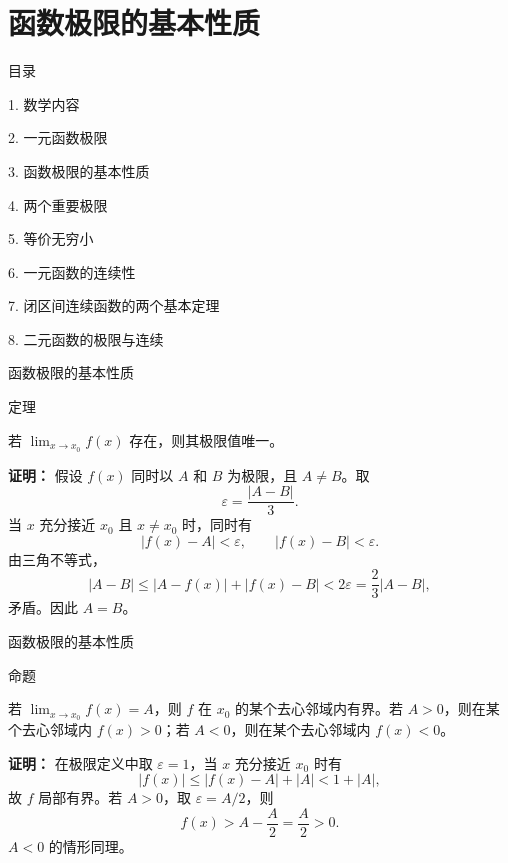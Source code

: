 \documentclass[aspectratio=169,10pt,fontset=fandol]{ctexbeamer}
\begin{document}
\section{函数极限的基本性质}
\begin{frame}[t,fragile]{目录}
\normalsize
{\color{black}\normalsize 1. 数学内容\par}\vspace{0.3em}
{\color{black}\normalsize 2. 一元函数极限\par}\vspace{0.3em}
{\color{blue}\normalsize 3. 函数极限的基本性质\par}\vspace{0.3em}
{\color{gray!40}\normalsize 4. 两个重要极限\par}\vspace{0.3em}
{\color{gray!40}\normalsize 5. 等价无穷小\par}\vspace{0.3em}
{\color{gray!40}\normalsize 6. 一元函数的连续性\par}\vspace{0.3em}
{\color{gray!40}\normalsize 7. 闭区间连续函数的两个基本定理\par}\vspace{0.3em}
{\color{gray!40}\normalsize 8. 二元函数的极限与连续\par}\vspace{0.3em}
\end{frame}
\begin{frame}[t,fragile]{函数极限的基本性质}
\normalsize
\begin{block}{定理}
{\normalsize

若 \(\lim_{x\to x_0}f(x)\) 存在，则其极限值唯一。

}
\end{block}
\pause
{\normalsize
\textbf{证明：}
假设 \(f(x)\) 同时以 \(A\) 和 \(B\) 为极限，且 \(A\neq B\)。取
\[
\varepsilon=\frac{|A-B|}{3}.
\]
当 \(x\) 充分接近 \(x_0\) 且 \(x\neq x_0\) 时，同时有
\[
|f(x)-A|<\varepsilon,\qquad |f(x)-B|<\varepsilon.
\]
由三角不等式，
\[
|A-B|\leq |A-f(x)|+|f(x)-B|<2\varepsilon=\frac23|A-B|,
\]
矛盾。因此 \(A=B\)。

}
\end{frame}
\begin{frame}[t,fragile]{函数极限的基本性质}
\normalsize
\begin{block}{命题}
{\normalsize

若 \(\lim_{x\to x_0}f(x)=A\)，则 \(f\) 在 \(x_0\) 的某个去心邻域内有界。若 \(A>0\)，则在某个去心邻域内 \(f(x)>0\)；若 \(A<0\)，则在某个去心邻域内 \(f(x)<0\)。

}
\end{block}
\pause
{\normalsize
\textbf{证明：}
在极限定义中取 \(\varepsilon=1\)，当 \(x\) 充分接近 \(x_0\) 时有
\[
|f(x)|\leq |f(x)-A|+|A|<1+|A|,
\]
故 \(f\) 局部有界。若 \(A>0\)，取 \(\varepsilon=A/2\)，则
\[
f(x)>A-\frac A2=\frac A2>0.
\]
\(A<0\) 的情形同理。

}
\end{frame}
\end{document}
